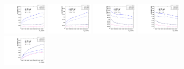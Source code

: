\begin{figure}[htbp]
  \centering
  \includegraphics[width=0.2\textwidth]{fig/2Dfit/paramSignalYield_VBFSig_mu_HP_nobb_LDy.pdf}
  \includegraphics[width=0.2\textwidth]{fig/2Dfit/paramSignalYield_VBFSig_e_HP_nobb_LDy.pdf}
  \includegraphics[width=0.2\textwidth]{fig/2Dfit/paramSignalYield_VBFSig_mu_LP_nobb_LDy.pdf}
  \includegraphics[width=0.2\textwidth]{fig/2Dfit/paramSignalYield_VBFSig_e_LP_nobb_LDy.pdf}\\
  \includegraphics[width=0.2\textwidth]{fig/2Dfit/paramSignalYield_VBFSig_mu_HP_nobb_HDy.pdf}

\end{figure}
